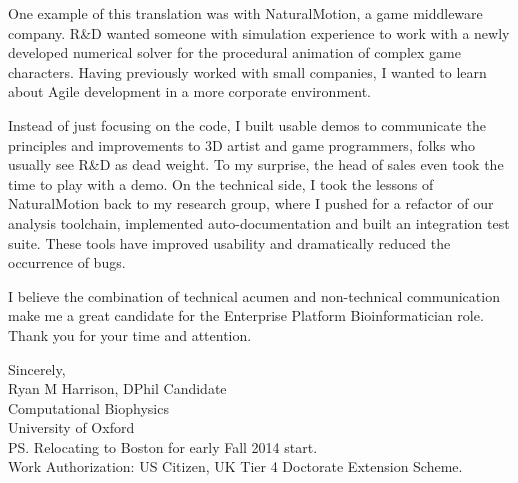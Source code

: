 \documentclass{../res}
\begin{document}
\begin{sloppypar}
\begin{resume}
One example of this translation was with NaturalMotion, a game middleware company. R\&D wanted someone with simulation experience to work with a newly developed numerical solver for the procedural animation of complex game characters. Having previously worked with small companies, I wanted to learn about Agile development in a more corporate environment. 

Instead of just focusing on the code, I built usable demos to communicate the principles and improvements to 3D artist and game programmers, folks who usually see R\&D as dead weight. To my surprise, the head of sales even took the time to play with a demo. On the technical side, I took the lessons of NaturalMotion back to my research group, where I pushed for a refactor of our analysis toolchain, implemented auto-documentation and built an integration test suite. These tools have improved usability and dramatically reduced the occurrence of bugs. 

I believe the combination of technical acumen and non-technical communication make me a great candidate for the Enterprise Platform Bioinformatician role. Thank you for your time and attention.

Sincerely, \\
Ryan M Harrison, DPhil Candidate \\
Computational Biophysics \\
University of Oxford  \\
PS. Relocating to Boston for early Fall 2014 start. \\
Work Authorization: US Citizen, UK Tier 4 Doctorate Extension Scheme.
\end{resume} 
\end{sloppypar}
\end{document}
